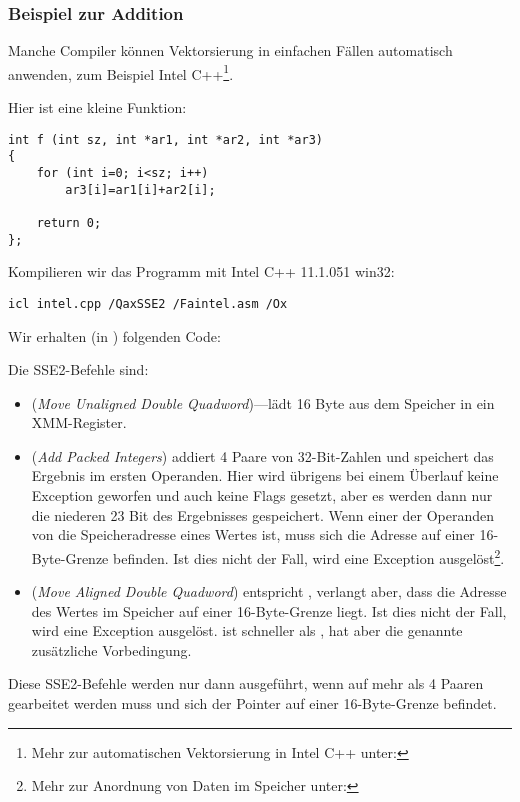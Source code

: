 \subsubsection{Beispiel zur Addition}

Manche Compiler können Vektorsierung in einfachen Fällen automatisch anwenden, zum Beispiel Intel C++\footnote{Mehr zur
automatischen Vektorsierung in Intel C++ unter:\URLINTELVEC}.

Hier ist eine kleine Funktion:

\begin{lstlisting}[style=customc]
int f (int sz, int *ar1, int *ar2, int *ar3)
{
	for (int i=0; i<sz; i++)
		ar3[i]=ar1[i]+ar2[i];

	return 0;
};
\end{lstlisting}


Kompilieren wir das Programm mit Intel C++ 11.1.051 win32:

\begin{verbatim}
icl intel.cpp /QaxSSE2 /Faintel.asm /Ox
\end{verbatim}

Wir erhalten (in \IDA) folgenden Code:



Die SSE2-Befehle sind:
\begin{itemize}
\item
\MOVDQU (\emph{Move Unaligned Double Quadword})---lädt 16 Byte aus dem Speicher in ein XMM-Register.

\item
\PADDD (\emph{Add Packed Integers}) addiert 4 Paare von 32-Bit-Zahlen und speichert das Ergebnis im ersten Operanden.
Hier wird übrigens bei einem Überlauf keine Exception geworfen und auch keine Flags gesetzt, aber es werden dann nur die
niederen 23 Bit des Ergebnisses gespeichert.
Wenn einer der Operanden von \PADDD die Speicheradresse eines Wertes ist, muss sich die Adresse auf einer 16-Byte-Grenze
befinden. Ist dies nicht der Fall, wird eine Exception ausgelöst\footnote{Mehr zur Anordnung von Daten im Speicher
unter:\URLWPDA}.

\item
\MOVDQA (\emph{Move Aligned Double Quadword}) entspricht \MOVDQU, verlangt aber, dass die Adresse des Wertes im Speicher
auf einer 16-Byte-Grenze liegt. Ist dies nicht der Fall, wird eine Exception ausgelöst. \MOVDQA ist schneller als
\MOVDQU, hat aber die genannte zusätzliche Vorbedingung.

\end{itemize}
Diese SSE2-Befehle werden nur dann ausgeführt, wenn auf mehr als 4 Paaren gearbeitet werden muss und sich der Pointer
 auf einer 16-Byte-Grenze befindet.

